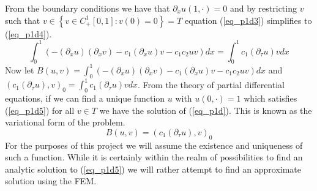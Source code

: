 \documentclass[11pt,fleqn]{article}
\theoremstyle{defstyle}
\begin{document}
From the boundary conditions we have that $\partial_xu(1,\cdot)=0$ and by restricting $v$ such that $v \in \left\{v \in C^1_+[0, 1] : v(0)=0 \right\} = T$ equation (\ref{eq_p1d3}) simplifies to (\ref{eq_p1d4}).
\begin{equation}
\int_0^1 (-(\partial_xu)(\partial_xv) - c_1(\partial_xu)v - c_1c_2uv)dx = \int^1_0 c_1(\partial_{\tau}u)v dx
\label{eq_p1d4}
\end{equation}
Now let $B(u, v) = \int_0^1 (-(\partial_xu)(\partial_xv) - c_1(\partial_xu)v - c_1c_2uv)dx$ and $(c_1(\partial_{\tau}u),v)_0 = \int^1_0 c_1(\partial_{\tau}u)v dx$. From the theory of partial differential equations, if we can find a unique function $u$ with $u(0, \cdot)=1$ which satisfies (\ref{eq_p1d5}) for all $v \in T$ we have the solution of (\ref{eq_p1d}). This is known as the variational form of the problem. 
\begin{equation}
B(u, v) = (c_1(\partial_{\tau}u),v)_0
\label{eq_p1d5}
\end{equation}
For the purposes of this project we will assume the existence and uniqueness of such a function. While it is certainly within the realm of possibilities to find an analytic solution to (\ref{eq_p1d5}) we will rather attempt to find an approximate solution using the FEM.
\end{document}
